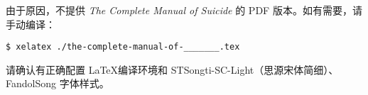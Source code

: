 \documentclass[UTF8]{ctexart}
\begin{document}
由于原因，不提供 \textit{The Complete Manual of Suicide} 的 PDF 版本。如有需要，请手动编译：

\begin{lstlisting}
$ xelatex ./the-complete-manual-of-_______.tex
\end{lstlisting}

请确认有正确配置 \LaTeX 编译环境和 STSongti-SC-Light（思源宋体简细）、FandolSong 字体样式。
\end{document}
